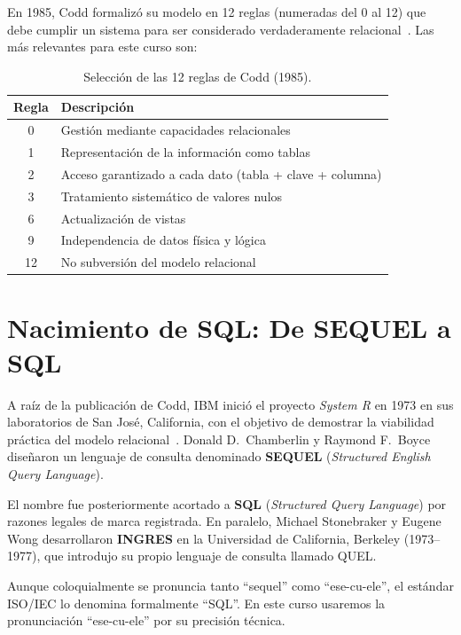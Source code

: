 En 1985, Codd formalizó su modelo en 12 reglas
(numeradas del 0 al 12) que debe cumplir un sistema para
ser considerado verdaderamente relacional~\cite{codd1985}.
Las más relevantes para este curso son:

\begin{table}[H]
\centering
\small
\renewcommand{\arraystretch}{1.3}
\begin{tabularx}{\columnwidth}{@{} c X @{}}
\toprule
\textbf{Regla} & \textbf{Descripción} \\
\midrule
0 & Gestión mediante capacidades relacionales \\
1 & Representación de la información como tablas \\
2 & Acceso garantizado a cada dato (tabla + clave + columna) \\
3 & Tratamiento sistemático de valores nulos \\
6 & Actualización de vistas \\
9 & Independencia de datos física y lógica \\
12 & No subversión del modelo relacional \\
\bottomrule
\end{tabularx}
\caption{Selección de las 12 reglas de Codd (1985).}
\label{tab:reglas-codd}
\end{table}

\section{Nacimiento de SQL: De SEQUEL a SQL}

A raíz de la publicación de Codd, IBM inició el proyecto
\textit{System R} en 1973 en sus laboratorios de San José,
California, con el objetivo de demostrar la viabilidad práctica del
modelo relacional~\cite{chamberlin1974}.
Donald D.\ Chamberlin y Raymond F.\ Boyce diseñaron un lenguaje de
consulta denominado \textbf{SEQUEL}
(\textit{Structured English Query Language}).

El nombre fue posteriormente acortado a \textbf{SQL}
(\textit{Structured Query Language}) por razones legales de marca
registrada.
En paralelo, Michael Stonebraker y Eugene Wong desarrollaron
\textbf{INGRES} en la Universidad de California, Berkeley (1973–1977),
que introdujo su propio lenguaje de consulta llamado QUEL.

\begin{nota}
Aunque coloquialmente se pronuncia tanto ``sequel'' como
``ese-cu-ele'', el estándar ISO/IEC lo denomina formalmente
``SQL''. En este curso usaremos la pronunciación ``ese-cu-ele''
por su precisión técnica.
\end{nota}


